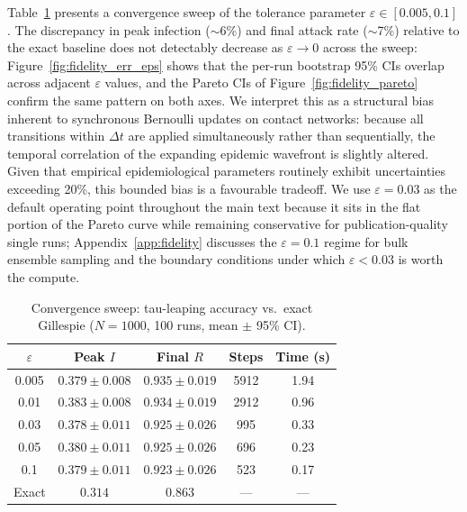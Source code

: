 Table~\ref{tab:epsilon_sweep} presents a convergence sweep of the tolerance parameter $\varepsilon \in [0.005, 0.1]$. The discrepancy in peak infection ($\sim$6\%) and final attack rate ($\sim$7\%) relative to the exact baseline does not detectably decrease as $\varepsilon \to 0$ across the sweep: Figure~\ref{fig:fidelity_err_eps} shows that the per-run bootstrap 95\% CIs overlap across adjacent $\varepsilon$ values, and the Pareto CIs of Figure~\ref{fig:fidelity_pareto} confirm the same pattern on both axes. We interpret this as a structural bias inherent to synchronous Bernoulli updates on contact networks: because all transitions within $\Delta t$ are applied simultaneously rather than sequentially, the temporal correlation of the expanding epidemic wavefront is slightly altered. Given that empirical epidemiological parameters routinely exhibit uncertainties exceeding 20\%, this bounded bias is a favourable tradeoff. We use $\varepsilon = 0.03$ as the default operating point throughout the main text because it sits in the flat portion of the Pareto curve while remaining conservative for publication-quality single runs; Appendix~\ref{app:fidelity} discusses the $\varepsilon = 0.1$ regime for bulk ensemble sampling and the boundary conditions under which $\varepsilon < 0.03$ is worth the compute.

\begin{table}[H]
\caption{Convergence sweep: tau-leaping accuracy vs.\ exact Gillespie ($N=1000$, 100 runs, mean $\pm$ 95\% CI).}
\label{tab:epsilon_sweep}
\centering
\begin{tabular*}{\linewidth}{@{}ccccc@{}}
\toprule
$\varepsilon$ & Peak $I$ & Final $R$ & Steps & Time (s) \\
\midrule
0.005 & $0.379 \pm 0.008$ & $0.935 \pm 0.019$ & 5912 & 1.94 \\
0.01 & $0.383 \pm 0.008$ & $0.934 \pm 0.019$ & 2912 & 0.96 \\
0.03 & $0.378 \pm 0.011$ & $0.925 \pm 0.026$ & 995 & 0.33 \\
0.05 & $0.380 \pm 0.011$ & $0.925 \pm 0.026$ & 696 & 0.23 \\
0.1 & $0.379 \pm 0.011$ & $0.923 \pm 0.026$ & 523 & 0.17 \\
\midrule
Exact & $0.314$ & $0.863$ & --- & --- \\
\bottomrule
\end{tabular*}
\end{table}


